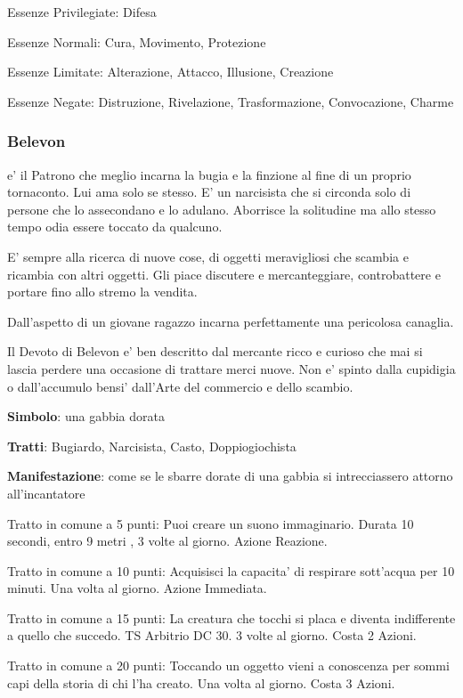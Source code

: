 \documentclass[a4paper,11pt,twoside,openany]{dndbook}
\begin{document}
{Essenze Privilegiate: Difesa

Essenze Normali: Cura, Movimento, Protezione

Essenze Limitate: Alterazione, Attacco, Illusione, Creazione

Essenze Negate: Distruzione, Rivelazione, Trasformazione, Convocazione, Charme

\subsubsection{Belevon}

\label{belevon}

e' il Patrono che meglio incarna la bugia e la finzione al fine di un proprio tornaconto. Lui ama solo se stesso. E' un narcisista che si circonda solo di persone che lo assecondano e lo adulano. Aborrisce la solitudine ma allo stesso tempo odia essere toccato da qualcuno.

E' sempre alla ricerca di nuove cose, di oggetti meravigliosi che scambia e ricambia con altri oggetti. Gli piace discutere e mercanteggiare, controbattere e portare fino allo stremo la vendita.

Dall'aspetto di un giovane ragazzo incarna perfettamente una pericolosa canaglia.

Il Devoto di Belevon e' ben descritto dal mercante ricco e curioso che mai si lascia perdere una occasione di trattare merci nuove. Non e' spinto dalla cupidigia o dall'accumulo bensi' dall'Arte del commercio e dello scambio.

\textbf{Simbolo}: una gabbia dorata

\textbf{Tratti}: Bugiardo, Narcisista, Casto, Doppiogiochista

\textbf{Manifestazione}: come se le sbarre dorate di una gabbia si intrecciassero attorno all'incantatore

\bigskip

Tratto in comune a 5 punti: Puoi creare un suono immaginario. Durata 10 secondi, entro 9 metri , 3 volte al giorno. Azione Reazione.

Tratto in comune a 10 punti: Acquisisci la capacita' di respirare sott'acqua per 10 minuti. Una volta al giorno. Azione Immediata.

Tratto in comune a 15 punti: La creatura che tocchi si placa e diventa indifferente a quello che succedo. TS Arbitrio DC 30. 3 volte al giorno. Costa 2 Azioni.

Tratto in comune a 20 punti: Toccando un oggetto vieni a conoscenza per sommi capi della storia di chi l'ha creato. Una volta al giorno. Costa 3 Azioni.

}
\end{document}
